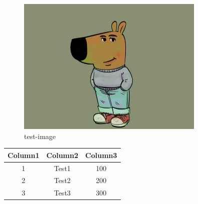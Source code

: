 \documentclass{article}
\begin{document}
\begin{figure}[h!]
\centering
\includegraphics[width=0.8\textwidth]{./sample_image.jpg}
\caption{test-image}
\label{fig:test-image}
\end{figure}\begin{tabular}{|c|c|c|}
\hline
Column1 & Column2 & Column3 \\
\hline
1 & Test1 & 100 \\
\hline
2 & Test2 & 200 \\
\hline
3 & Test3 & 300 \\
\hline
\end{tabular}
\end{document}
